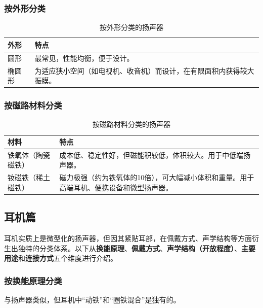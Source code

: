 \documentclass[12pt,UTF8]{ctexbook}
\begin{document}
\subsubsection{按外形分类}
\begin{table}[h]
\centering
\caption{按外形分类的扬声器}
\begin{tabular}{p{3cm}p{8cm}}
\toprule
\textbf{外形} & \textbf{特点} \\
\midrule
圆形 & 最常见，性能均衡，便于设计。 \\
椭圆形 & 为适应狭小空间（如电视机、收音机）而设计，在有限面积内获得较大振膜。 \\
\bottomrule
\end{tabular}
\end{table}
	
\subsubsection{按磁路材料分类}
\begin{table}[h]
\centering
\caption{按磁路材料分类的扬声器}
\begin{tabular}{p{3cm}p{8cm}}
\toprule
\textbf{材料} & \textbf{特点} \\
\midrule
铁氧体（陶瓷磁铁） & 成本低、稳定性好，但磁能积较低，体积较大。用于中低端扬声器。 \\
钕磁铁（稀土磁铁） & 磁力极强（约为铁氧体的10倍），可大幅减小体积和重量。用于高端耳机、便携设备和微型扬声器。 \\
\bottomrule
\end{tabular}
\end{table}
	
\subsection{耳机篇}

耳机实质上是微型化的扬声器，但因其紧贴耳部，在佩戴方式、声学结构等方面衍生出独特的分类体系。以下从\textbf{换能原理}、\textbf{佩戴方式}、\textbf{声学结构（开放程度）}、\textbf{主要用途}和\textbf{连接方式}五个维度进行介绍。
	
\subsubsection{按换能原理分类}

与扬声器类似，但耳机中“动铁”和“圈铁混合”是独有的。
	
\end{document}
